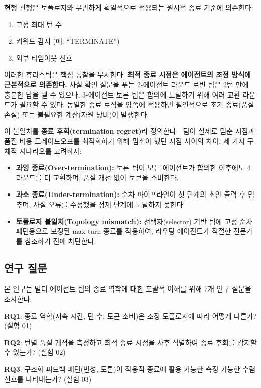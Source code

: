 \documentclass[a4paper,11pt]{article}
\begin{document}
현행 관행은 토폴로지와 무관하게 획일적으로 적용되는 원시적 종료 기준에 의존한다:
\begin{enumerate}[label=(\roman*)]
    \item 고정 최대 턴 수
    \item 키워드 감지 (예: ``TERMINATE'')
    \item 외부 타임아웃 신호
\end{enumerate}

이러한 휴리스틱은 핵심 통찰을 무시한다: \textbf{최적 종료 시점은 에이전트의 조정 방식에 근본적으로 의존한다.} 사실 확인 질문을 푸는 2-에이전트 라운드 로빈 팀은 2턴 만에 충분한 답을 낼 수 있으나, 3-에이전트 토론 팀은 합의에 도달하기 위해 여러 교환 라운드가 필요할 수 있다. 동일한 종료 로직을 양쪽에 적용하면 필연적으로 조기 종료(품질 손실) 또는 불필요한 계산(자원 낭비)이 발생한다.

이 불일치를 \textbf{종료 후회(termination regret)}라 정의한다---팀이 실제로 멈춘 시점과 품질-비용 트레이드오프를 최적화하기 위해 멈춰야 했던 시점 사이의 차이. 세 가지 구체적 시나리오를 고려하자:

\begin{itemize}
    \item \textbf{과잉 종료(Over-termination):} 토론 팀이 모든 에이전트가 합의한 이후에도 4라운드를 더 교환하며, 품질 개선 없이 토큰을 소비한다.
    \item \textbf{과소 종료(Under-termination):} 순차 파이프라인이 첫 단계의 초안 출력 후 멈추며, 사실 오류를 수정했을 정제 단계에 도달하지 못한다.
    \item \textbf{토폴로지 불일치(Topology mismatch):} 선택자(selector) 기반 팀에 고정 순차 패턴용으로 보정된 max-turn 종료를 적용하여, 라우팅 에이전트가 적절한 전문가를 참조하기 전에 차단한다.
\end{itemize}

\subsection{연구 질문}

본 연구는 멀티 에이전트 팀의 종료 역학에 대한 포괄적 이해를 위해 7개 연구 질문을 조사한다:

\textbf{RQ1}: 종료 역학(지속 시간, 턴 수, 토큰 소비)은 조정 토폴로지에 따라 어떻게 다른가? (실험 01)

\textbf{RQ2}: 턴별 품질 궤적을 측정하고 최적 종료 시점을 사후 식별하여 종료 후회를 감지할 수 있는가? (실험 02)

\textbf{RQ3}: 구조화 피드백 패턴(반성, 토론)이 적응적 종료에 활용 가능한 측정 가능한 수렴 신호를 나타내는가? (실험 03)
\end{document}
